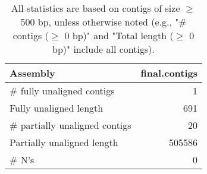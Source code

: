 \documentclass[12pt,a4paper]{article}
\begin{document}
\begin{table}[ht]
\begin{center}
\caption{All statistics are based on contigs of size $\geq$ 500 bp, unless otherwise noted (e.g., "\# contigs ($\geq$ 0 bp)" and "Total length ($\geq$ 0 bp)" include all contigs).}
\begin{tabular}{|l*{1}{|r}|}
\hline
Assembly & final.contigs \\ \hline
\# fully unaligned contigs & 1 \\ \hline
Fully unaligned length & 691 \\ \hline
\# partially unaligned contigs & 20 \\ \hline
Partially unaligned length & 505586 \\ \hline
\# N's & 0 \\ \hline
\end{tabular}
\end{center}
\end{table}
\end{document}
